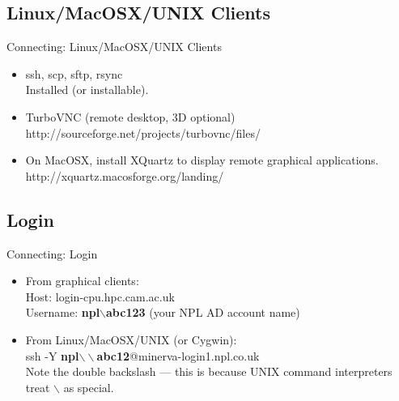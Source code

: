 \subsection{Linux/MacOSX/UNIX Clients}
\begin{frame}{Connecting: Linux/MacOSX/UNIX Clients}
\begin{itemize}
\item {\color<2->{red}ssh}, scp, sftp, {rsync}\hfill\\
\alert{\small Installed (or installable).}
\item<3-> TurboVNC \alert{\small (remote desktop, 3D optional)}\hfill\\
\alert{\small http://sourceforge.net/projects/turbovnc/files/}
\item<4-> On MacOSX, install \alert{XQuartz} to display remote graphical applications.\hfill\\
\alert{\small http://xquartz.macosforge.org/landing/}
\end{itemize}
\end{frame}

\subsection{Login}
\begin{frame}{Connecting: Login}
\begin{itemize}
\item From graphical clients:\hfill\\
Host: \alert{login-cpu.hpc.cam.ac.uk}\hfill\\
Username: \alert{\textbf{npl$\backslash$abc123}} (your NPL AD account name)
\pause
\item From Linux/MacOSX/UNIX (or Cygwin):\hfill\\\medskip
  \alert{ssh -Y \textbf{npl$\backslash\backslash$abc12}@minerva-login1.npl.co.uk}\hfill\\\medskip
  Note the double backslash --- this is because UNIX command interpreters treat $\backslash$ as special.
\end{itemize}
\end{frame}

